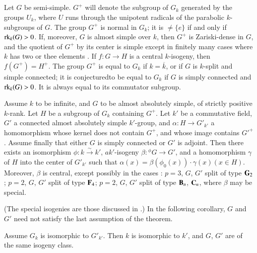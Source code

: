 \subsection{}\label{art05-sec1.1}
Let $G$ be semi-simple. $G^{+}$ will denote the subgroup of $G_{k}$ generated by the groups $U_{k}$, where $U$ runs through the unipotent radicals of the parabolic $k$-subgroups of $G$. The group $G^{+}$ is normal in $G_{k}$; it is $\neq \{e\}$ if and only if $\operatorname{\mathrm{rk}}_{k}(G)>0$. If, moreover, $G$ is almost simple over $k$, then $G^{+}$ is Zariski-dense in $G$, and the quotient of $G^{+}$ by its center is simple except in finitely many cases where $k$ has two or thee elements \cite{art05-key10}. If $f:G\to H$ is a central $k$-isogeny, then $f(G^{+})=H^{+}$. The group $G^{+}$ is equal to $G_{k}$ if $k=\overline{k}$, or if $G$ is $k$-split and simple connected; it is conjectured\pageoriginale to be equal to $G_{k}$ if $G$ is simply connected and $\operatorname{\mathrm{rk}}_{k}(G)>0$\cite{art05-key10}. It is always equal to its commutator subgroup.

\setcounter{theorem}{1}
\begin{theorem}\label{art05-thm1.2}\label{ART05-THM1.2}
Assume $k$ to be infinite, and $G$ to be almost absolutely simple, of strictly positive $k$-rank. Let $H$ be a subgroup of $G_{k}$ containing $G^{+}$. Let $k'$ be a commutative field, $G'$ a connected almost absolutely simple $k'$-group, and $\alpha:H\to G'_{k'}$ a homomorphism whose kernel does not contain $G^{+}$, and whose image contains ${G'}^{+}$. Assume finally that either $G$ is simply connected or $G'$ is adjoint. Then there exists an isomorphism $\phi:k\xrightarrow{\sim}k'$, $ak'$-isogeny $\beta:{}^{\phi}G\to G'$, and a homomorphism $\gamma$ of $H$ into the center of $G'_{k'}$ such that $\alpha(x)=\beta(\phi_{0}(x))\cdot \gamma(x)(x\in H)$. Moreover, $\beta$ is central, except possibly in the cases : $p=3$, $G$, $G'$ split of type $\mathbf{G}_{2}$; $p=2$, $G$, $G'$ split of type $\mathbf{F}_{4}$; $p=2$, $G$, $G'$ split of type $\mathbf{B}_{n}$, $\mathbf{C}_{n}$, where $\beta$ may be special.
\end{theorem}

(The special isogenies are those discussed in \cite[Exp. 21-24]{art05-key3}.) In the following corollary, $G$ and $G'$ need not satisfy the last assumption of the theorem.

\begin{corollary}\label{art05-coro1.3}
Assume $G_{k}$ is isomorphic to $G'_{k'}$. Then $k$ is isomorphic to $k'$, and $G$, $G'$ are of the same isogeny class.
\end{corollary}

